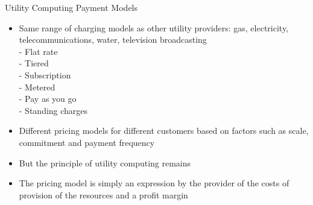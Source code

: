 \documentclass{SKP-beamer}
\begin{document}
\begin{frame}{ Utility Computing Payment Models}
	\begin{itemize}
		
		\item   Same range of charging models as other utility providers: gas, electricity, telecommunications, water, 
		television broadcasting \\
		 - Flat rate \\
		 - Tiered \\
		 - Subscription \\
		 - Metered \\
		 - Pay as you go \\
		 - Standing charges \\
		\item Different pricing models for different customers based on factors such as scale, commitment and 
		payment frequency
		\item But the principle of utility computing remains
		\item The pricing model is simply an expression by the provider of the costs of provision of the resources and a 
		profit margin
		
		
		
		
		
	\end{itemize}
\end{frame}
\end{document}

